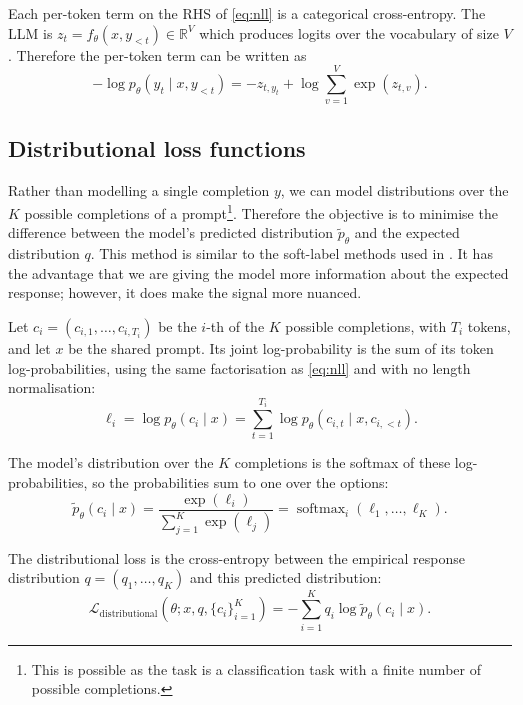 Each per-token term on the RHS of \eqref{eq:nll} is a categorical cross-entropy. The LLM is $z_t = f_\theta(x, y_{<t}) \in \mathbb{R}^V$ which produces logits over the vocabulary of size $V$. Therefore the per-token term can be written as
\begin{equation}
  -\log p_\theta\!\left(y_t \mid x, y_{<t}\right)
  = -z_{t, y_t} + \log\!\sum_{v=1}^{V} \exp(z_{t, v}).
  \label{eq:ce}
\end{equation}

\subsection{Distributional loss functions}

Rather than modelling a single completion $y$, we can model distributions over the $K$ possible completions of a prompt\footnote{This is possible as the task is a classification task with a finite number of possible completions.}. Therefore the objective is to minimise the difference between the model's predicted distribution $\tilde{p}_\theta$ and the expected distribution $q$. This method is similar to the soft-label methods used in \cite{fornaciariBlackWhiteLeveraging2021,caoSpecializingLargeLanguage2025,suhLanguageModelFineTuning2025,huangDistributionShiftAlignment2025}. It has the advantage that we are giving the model more information about the expected response; however, it does make the signal more nuanced.


Let $c_i = (c_{i,1}, \dots, c_{i,T_i})$ be the $i$-th of the $K$ possible completions, with $T_i$ tokens, and let $x$ be the shared prompt. Its joint log-probability is the sum of its token log-probabilities, using the same factorisation as \eqref{eq:nll} and with no length normalisation:
\begin{equation}
    \ell_i = \log p_\theta(c_i \mid x)
    = \sum_{t=1}^{T_i} \log p_\theta(c_{i,t} \mid x, c_{i,<t}).
    \label{eq:joint-logprob}
\end{equation}

\noindent The model's distribution over the $K$ completions is the softmax of these log-probabilities, so the probabilities sum to one over the options:
\begin{equation}
    \tilde{p}_\theta(c_i \mid x)
    = \frac{\exp(\ell_i)}{\sum_{j=1}^{K} \exp(\ell_j)}
    = \operatorname{softmax}_i(\ell_1, \dots, \ell_K).
    \label{eq:option-softmax}
\end{equation}

\noindent The distributional loss is the cross-entropy between the empirical response distribution $q = (q_1, \dots, q_K)$ and this predicted distribution:
\begin{equation}
    \mathcal{L}_{\mathrm{distributional}}(\theta; x, q, \{c_i\}_{i=1}^{K})
    = - \sum_{i=1}^{K} q_i \log\tilde{p}_\theta(c_i \mid x).
    \label{eq:distributional}
\end{equation}


